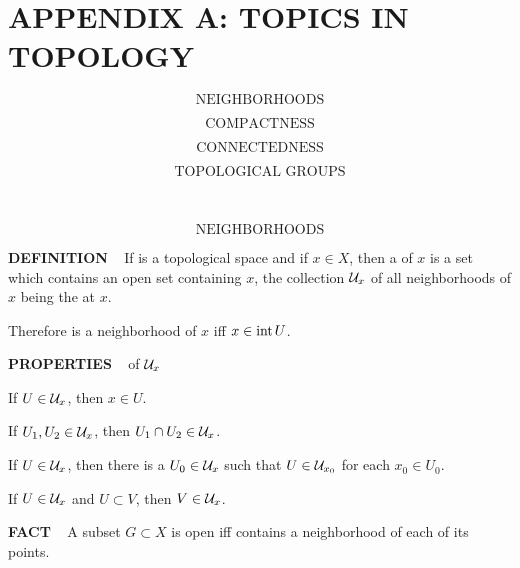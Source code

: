 \chapter{
APPENDIX A: TOPICS IN TOPOLOGY}
\setlength\parindent{2em}
\setcounter{theoremn}{0}



\[
\text{NEIGHBORHOODS}
\]

\[
\text{COMPACTNESS}
\]

\[
\text{CONNECTEDNESS}
\]

\[
\text{TOPOLOGICAL GROUPS}
\]
\newpage

\ \indent 

\[
\text{NEIGHBORHOODS}
\]

\begin{x}{\small\bf DEFINITION} \ %
If \mX is a topological space and if $x \in X$, then a 
of $x$ is a set \mU which contains an open set \mV containing $x$, the collection $\mathcal{U}_x$ of all neighborhoods of $x$ 
being the 
at $x$.
\end{x}

\vspace{0.1cm}

Therefore \mU is a neighborhood of $x$ iff $x \in \text{int}\hspace{0.05cm} U$.

\vspace{0.2cm}


\begin{x}{\small\bf PROPERTIES} \ %
of $\mathcal{U}_x$

\vspace{0.1cm}

 \quad If $U \in \mathcal{U}_x$, then $x \in U$.

 \quad If $U_1, U_2 \in \mathcal{U}_x$, then $U_1 \cap U_2 \in \mathcal{U}_x$.

 \quad If $U \in \mathcal{U}_x$, then there is a $U_0 \in \mathcal{U}_x$ such that $U \in \mathcal{U}_{x_0}$ for each $x_0 \in U_0$.

 \quad If $U \in \mathcal{U}_x$ and $U \subset V$, then $V \in \mathcal{U}_x$.

\end{x}

\vspace{0.1cm}

\begin{x}{\small\bf FACT} \ %
A subset $G \subset X$ is open iff \mG contains a neighborhood of each of its points.
\end{x}

